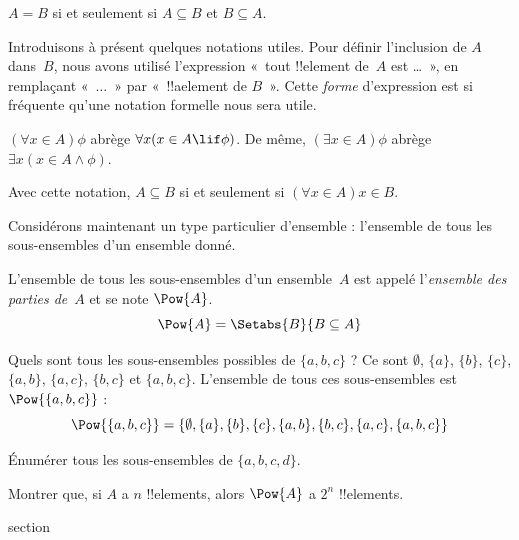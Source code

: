 \documentclass[11pt,a4paper,openany]{memoir}
\begin{document}
\begin{prop}
$A = B$ si et seulement si $A \subseteq B$ et $B \subseteq A$.
\end{prop}

Introduisons à présent quelques notations utiles. Pour définir
l'inclusion de $A$ dans~$B$, nous avons utilisé l'expression
«~tout !!{element} de~$A$ est \dots~», en remplaçant «~$\dots$~»
par «~!!a{element} de $B$~». Cette \emph{forme}
d'expression est si fréquente qu'une notation formelle nous
sera utile.

\begin{defn}
$(\forall x \in A)\phi$ abrège $\forall x(x \in A \lif
\phi)$. De même, $(\exists x \in A)\phi$ abrège $\exists x(x
\in A \land \phi)$.
\end{defn}

Avec cette notation, $A \subseteq B$ si et seulement si
$(\forall x \in A)x \in B$.

Considérons maintenant un type particulier d'ensemble :
l'ensemble de tous les sous-ensembles d'un ensemble donné.

\begin{defn}
L'ensemble de tous les sous-ensembles d'un ensemble~$A$ est appelé
l'\emph{ensemble des parties de}~$A$ et se note $\Pow{A}$.
  \[
    \Pow{A} = \Setabs{B}{B \subseteq A}
  \]
\end{defn}

\begin{ex}
Quels sont tous les sous-ensembles possibles de $\{ a, b, c \}$ ?
Ce sont $\emptyset$, $\{a \}$, $\{b\}$, $\{c\}$, $\{a, b\}$,
$\{a, c\}$, $\{b, c\}$ et $\{a, b, c\}$. L'ensemble de tous
ces sous-ensembles est $\Pow{\{a,b,c\}}$ :
\[
\Pow{\{ a, b, c \}} = \{\emptyset, \{a \}, \{b\}, \{c\}, \{a, b\},
\{b, c\}, \{a, c\}, \{a, b, c\}\}
\]
\end{ex}

\begin{prob}
Énumérer tous les sous-ensembles de $\{a, b, c, d\}$.
\end{prob}

\begin{prob}
Montrer que, si $A$ a $n$ !!{element}s, alors $\Pow{A}$ a
$2^n$ !!{element}s.
\end{prob}


\endgroup



\begingroup
\expandafter\def\csname ol@sectioncs\endcsname{section}
\def\olfilename{important-sets}
\end{document}
